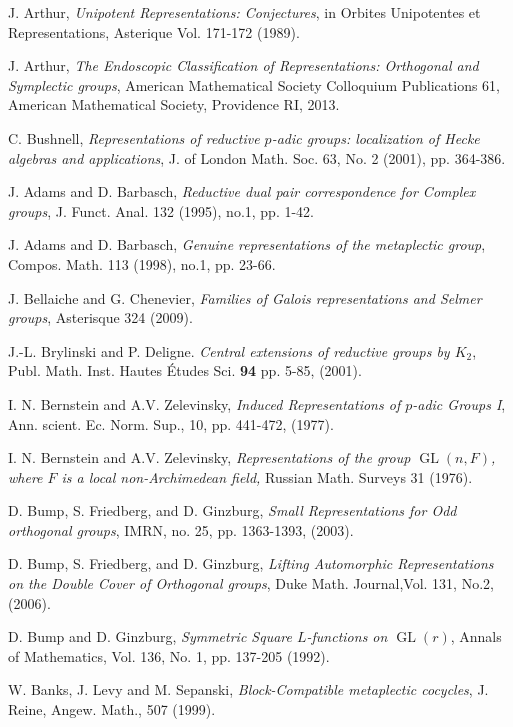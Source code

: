 \documentclass[11pt,reqno]{amsart}
\theoremstyle{definition}
\theoremstyle{remark}
\theoremstyle{definition}
\begin{document}

\begin{thebibliography}{99}
 J. Arthur, \emph{Unipotent Representations: Conjectures}, in Orbites Unipotentes et Representations, Asterique Vol. 171-172 (1989).

 J. Arthur, \emph{The Endoscopic Classification of Representations: Orthogonal and Symplectic groups}, American Mathematical Society Colloquium Publications 61, American Mathematical Society, Providence RI, 2013.

 C. Bushnell, \emph{Representations of reductive $p$-adic groups: localization of Hecke algebras and applications}, J. of London Math. Soc. 63, No. 2 (2001), pp. 364-386.

 J. Adams and D. Barbasch, \emph{Reductive dual pair correspondence for Complex groups}, J. Funct. Anal. 132 (1995), no.1, pp. 1-42.

 J. Adams and D. Barbasch, \emph{Genuine representations of the metaplectic group}, Compos. Math. 113 (1998), no.1, pp. 23-66.

 J. Bellaiche and G. Chenevier, \emph{Families of Galois representations and Selmer groups}, Asterisque 324 (2009).

 J.-L. Brylinski and P. Deligne. \emph{Central extensions of reductive groups by $K_2$}, Publ. Math. Inst. Hautes \'{E}tudes Sci. {\bf 94} pp. 5-85, (2001).

 I. N. Bernstein and A.V. Zelevinsky, \emph{Induced Representations of $p$-adic Groups I}, Ann. scient. Ec. Norm. Sup., 10, pp. 441-472, (1977).

 I. N. Bernstein and A.V. Zelevinsky, \emph{Representations of the group $\operatorname{GL}(n,F)$, where $F$ is a local non-Archimedean field,} Russian Math. Surveys 31 (1976).

 D. Bump, S. Friedberg, and D. Ginzburg, \emph{Small Representations for Odd orthogonal groups}, IMRN, no. 25, pp. 1363-1393, (2003).

 D. Bump, S. Friedberg, and D. Ginzburg, \emph{Lifting Automorphic Representations on the Double Cover of Orthogonal groups}, Duke Math. Journal,Vol. 131, No.2, (2006).

 D. Bump and D. Ginzburg, \emph{Symmetric Square $L$-functions on $\operatorname{GL}(r)$}, Annals of Mathematics, Vol. 136, No. 1, pp. 137-205 (1992).

 W. Banks, J. Levy and M. Sepanski, \emph{Block-Compatible metaplectic cocycles}, J. Reine, Angew. Math., 507 (1999).


\end{thebibliography}
\end{document}
